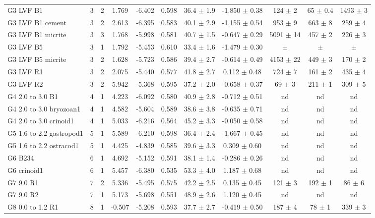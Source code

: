 \documentclass{article}
\begin{document}
\begin{sidewaystable}[htbp]
\begin{tabular}{ | l | c | c | c | c | c | c | c | c | c | c | }
G3 LVF B1 & 3 & 2 & 1.769 & -6.402 & 0.598 & 36.4 $\pm$ 1.9 & -1.850 $\pm$ 0.38 & 124 $\pm$ 2 & 65 $\pm$ 0.4 & 1493 $\pm$ 3 \\
G3 LVF B1 cement & 3 & 2 & 2.613 & -6.395 & 0.583 & 40.1 $\pm$ 2.9 & -1.155 $\pm$ 0.54 & 953 $\pm$ 9 & 663 $\pm$ 8 & 259 $\pm$ 4 \\
G3 LVF B1 micrite & 3 & 3 & 1.768 & -5.998 & 0.581 & 40.7 $\pm$ 1.5 & -0.647 $\pm$ 0.29 & 5091 $\pm$ 14 & 457 $\pm$ 2 & 226 $\pm$ 3 \\
G3 LVF B5 & 3 & 1 & 1.792 & -5.453 & 0.610 & 33.4 $\pm$ 1.6 & -1.479 $\pm$ 0.30 &  $\pm$  &  $\pm$  &  $\pm$  \\
G3 LVF B5 micrite & 3 & 2 & 1.628 & -5.723 & 0.586 & 39.4 $\pm$ 2.7 & -0.614 $\pm$ 0.49 & 4153 $\pm$ 22 & 449 $\pm$ 3 & 170 $\pm$ 2 \\
G3 LVF R1 & 3 & 2 & 2.075 & -5.440 & 0.577 & 41.8 $\pm$ 2.7 & 0.112 $\pm$ 0.48 & 724 $\pm$ 7 & 161 $\pm$ 2 & 435 $\pm$ 4 \\
G3 LVF R2 & 3 & 2 & 5.942 & -5.368 & 0.595 & 37.2 $\pm$ 2.0 & -0.658 $\pm$ 0.37 & 69 $\pm$ 3 & 211 $\pm$ 1 & 309 $\pm$ 5 \\
G4 2.0 to 3.0 B1 & 4 & 1 & 4.223 & -6.092 & 0.580 & 40.9 $\pm$ 2.8 & -0.712 $\pm$ 0.51 &  nd  &  nd  &  nd  \\
G4 2.0 to 3.0 bryozoan1 & 4 & 1 & 4.582 & -5.604 & 0.589 & 38.6 $\pm$ 3.8 & -0.635 $\pm$ 0.71 &  nd  &  nd  &  nd  \\
G4 2.0 to 3.0 crinoid1 & 4 & 1 & 5.033 & -6.216 & 0.564 & 45.2 $\pm$ 3.3 & -0.050 $\pm$ 0.58 &  nd  &  nd  &  nd  \\
G5 1.6 to 2.2 gastropod1 & 5 & 1 & 5.589 & -6.210 & 0.598 & 36.4 $\pm$ 2.4 & -1.667 $\pm$ 0.45 &  nd  &  nd  &  nd  \\
G5 1.6 to 2.2 ostracod1 & 5 & 1 & 4.425 & -4.839 & 0.585 & 39.6 $\pm$ 3.3 & 0.309 $\pm$ 0.60 &  nd  &  nd  &  nd  \\
G6 B234 & 6 & 1 & 4.692 & -5.152 & 0.591 & 38.1 $\pm$ 1.4 & -0.286 $\pm$ 0.26 &  nd  &  nd  &  nd  \\
G6 crinoid1 & 6 & 1 & 5.457 & -6.380 & 0.535 & 53.3 $\pm$ 4.0 & 1.187 $\pm$ 0.68 &  nd  &  nd  &  nd  \\
G7 9.0 R1 & 7 & 2 & 5.336 & -5.495 & 0.575 & 42.2 $\pm$ 2.5 & 0.135 $\pm$ 0.45 & 121 $\pm$ 3 & 192 $\pm$ 1 & 86 $\pm$ 6 \\
G7 9.0 R2 & 7 & 1 & 5.173 & -5.698 & 0.551 & 48.9 $\pm$ 2.6 & 1.120 $\pm$ 0.45 &  nd  &  nd  &  nd  \\
G8 0.0 to 1.2 R1 & 8 & 1 & -0.507 & -5.208 & 0.593 & 37.7 $\pm$ 2.7 & -0.419 $\pm$ 0.50 & 187 $\pm$ 4 & 78 $\pm$ 1 & 339 $\pm$ 3 \\

\end{tabular}
\end{sidewaystable}
\end{document}
